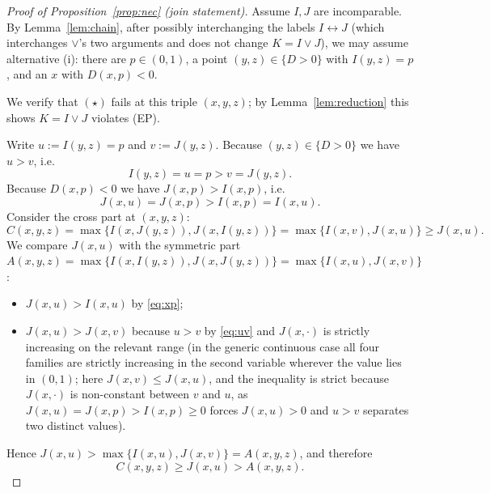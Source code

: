 \documentclass{amsart}
\theoremstyle{plain}
\theoremstyle{definition}
\begin{document}
\begin{proof}[Proof of Proposition~\ref{prop:nec} (join statement)]
Assume $I,J$ are incomparable. By Lemma~\ref{lem:chain}, after possibly interchanging the
labels $I\leftrightarrow J$ (which interchanges $\vee$'s two arguments and does not change
$K=I\vee J$), we may assume alternative (i): there are $p\in(0,1)$, a point
$(y,z)\in\{D>0\}$ with $I(y,z)=p$, and an $x$ with $D(x,p)<0$.

We verify that $(\star)$ fails at this triple $(x,y,z)$; by Lemma~\ref{lem:reduction} this
shows $K=I\vee J$ violates (EP).

Write $u:=I(y,z)=p$ and $v:=J(y,z)$. Because $(y,z)\in\{D>0\}$ we have $u>v$, i.e.
\begin{equation}\label{eq:uv}
I(y,z)=u=p>v=J(y,z).
\end{equation}
Because $D(x,p)<0$ we have $J(x,p)>I(x,p)$, i.e.
\begin{equation}\label{eq:xp}
J(x,u)=J(x,p)>I(x,p)=I(x,u).
\end{equation}
Consider the cross part at $(x,y,z)$:
\[
C(x,y,z)=\max\{I(x,J(y,z)),J(x,I(y,z))\}=\max\{I(x,v),J(x,u)\}\ge J(x,u).
\]
We compare $J(x,u)$ with the symmetric part
$A(x,y,z)=\max\{I(x,I(y,z)),J(x,J(y,z))\}=\max\{I(x,u),J(x,v)\}$:
\begin{itemize}
\item $J(x,u)>I(x,u)$ by \eqref{eq:xp};
\item $J(x,u)>J(x,v)$ because $u>v$ by \eqref{eq:uv} and $J(x,\cdot)$ is strictly
increasing on the relevant range (in the generic continuous case all four families are
strictly increasing in the second variable wherever the value lies in $(0,1)$; here
$J(x,v)\le J(x,u)$, and the inequality is strict because $J(x,\cdot)$ is non-constant
between $v$ and $u$, as $J(x,u)=J(x,p)>I(x,p)\ge0$ forces $J(x,u)>0$ and $u>v$ separates
two distinct values).
\end{itemize}
Hence $J(x,u)>\max\{I(x,u),J(x,v)\}=A(x,y,z)$, and therefore
\begin{equation}\label{eq:CgtA}
C(x,y,z)\ge J(x,u)>A(x,y,z).
\end{equation}


\end{proof}
\end{document}
